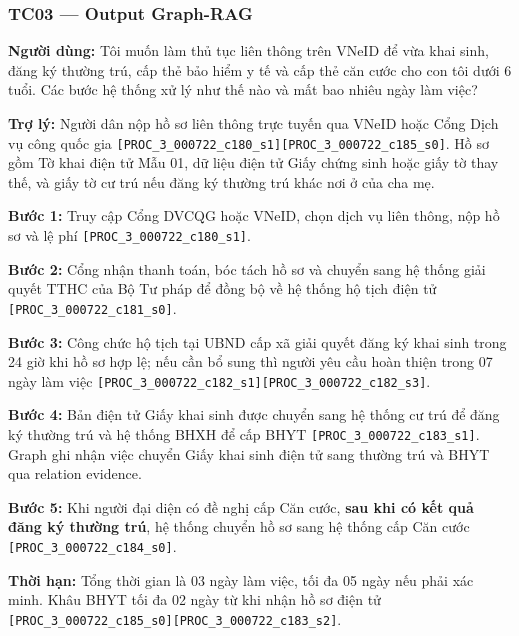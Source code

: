 \documentclass[11pt,a4paper]{article}
\newcommand{\src}[1]{\texttt{#1}}
\begin{document}
\subsubsection*{TC03 --- Output Graph-RAG}
\begin{questionbox}
\textbf{Người dùng:} Tôi muốn làm thủ tục liên thông trên VNeID để vừa khai sinh, đăng ký thường trú, cấp thẻ bảo hiểm y tế và cấp thẻ căn cước cho con tôi dưới 6 tuổi. Các bước hệ thống xử lý như thế nào và mất bao nhiêu ngày làm việc?
\end{questionbox}
\begin{answerbox}
\textbf{Trợ lý:} Người dân nộp hồ sơ liên thông trực tuyến qua VNeID hoặc Cổng Dịch vụ công quốc gia \src{[PROC\_3\_000722\_c180\_s1][PROC\_3\_000722\_c185\_s0]}. Hồ sơ gồm Tờ khai điện tử Mẫu 01, dữ liệu điện tử Giấy chứng sinh hoặc giấy tờ thay thế, và giấy tờ cư trú nếu đăng ký thường trú khác nơi ở của cha mẹ.

\textbf{Bước 1:} Truy cập Cổng DVCQG hoặc VNeID, chọn dịch vụ liên thông, nộp hồ sơ và lệ phí \src{[PROC\_3\_000722\_c180\_s1]}.

\textbf{Bước 2:} Cổng nhận thanh toán, bóc tách hồ sơ và chuyển sang hệ thống giải quyết TTHC của Bộ Tư pháp để đồng bộ về hệ thống hộ tịch điện tử \src{[PROC\_3\_000722\_c181\_s0]}.

\textbf{Bước 3:} Công chức hộ tịch tại UBND cấp xã giải quyết đăng ký khai sinh trong 24 giờ khi hồ sơ hợp lệ; nếu cần bổ sung thì người yêu cầu hoàn thiện trong 07 ngày làm việc \src{[PROC\_3\_000722\_c182\_s1][PROC\_3\_000722\_c182\_s3]}.

\textbf{Bước 4:} Bản điện tử Giấy khai sinh được chuyển sang hệ thống cư trú để đăng ký thường trú và hệ thống BHXH để cấp BHYT \src{[PROC\_3\_000722\_c183\_s1]}. Graph ghi nhận việc chuyển Giấy khai sinh điện tử sang thường trú và BHYT qua relation evidence.

\textbf{Bước 5:} Khi người đại diện có đề nghị cấp Căn cước, \textbf{sau khi có kết quả đăng ký thường trú}, hệ thống chuyển hồ sơ sang hệ thống cấp Căn cước \src{[PROC\_3\_000722\_c184\_s0]}.

\textbf{Thời hạn:} Tổng thời gian là 03 ngày làm việc, tối đa 05 ngày nếu phải xác minh. Khâu BHYT tối đa 02 ngày từ khi nhận hồ sơ điện tử \src{[PROC\_3\_000722\_c185\_s0][PROC\_3\_000722\_c183\_s2]}.
\end{answerbox}
\end{document}

